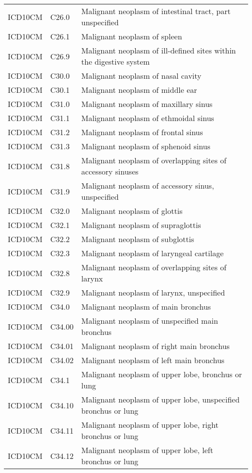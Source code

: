 \begin{table}[ht]
\begin{tabular}{lll}
  ICD10CM & C26.0 & Malignant neoplasm of intestinal tract, part unspecified \\ 
  ICD10CM & C26.1 & Malignant neoplasm of spleen \\ 
  ICD10CM & C26.9 & Malignant neoplasm of ill-defined sites within the digestive system \\ 
  ICD10CM & C30.0 & Malignant neoplasm of nasal cavity \\ 
  ICD10CM & C30.1 & Malignant neoplasm of middle ear \\ 
  ICD10CM & C31.0 & Malignant neoplasm of maxillary sinus \\ 
  ICD10CM & C31.1 & Malignant neoplasm of ethmoidal sinus \\ 
  ICD10CM & C31.2 & Malignant neoplasm of frontal sinus \\ 
  ICD10CM & C31.3 & Malignant neoplasm of sphenoid sinus \\ 
  ICD10CM & C31.8 & Malignant neoplasm of overlapping sites of accessory sinuses \\ 
  ICD10CM & C31.9 & Malignant neoplasm of accessory sinus, unspecified \\ 
  ICD10CM & C32.0 & Malignant neoplasm of glottis \\ 
  ICD10CM & C32.1 & Malignant neoplasm of supraglottis \\ 
  ICD10CM & C32.2 & Malignant neoplasm of subglottis \\ 
  ICD10CM & C32.3 & Malignant neoplasm of laryngeal cartilage \\ 
  ICD10CM & C32.8 & Malignant neoplasm of overlapping sites of larynx \\ 
  ICD10CM & C32.9 & Malignant neoplasm of larynx, unspecified \\ 
  ICD10CM & C34.0 & Malignant neoplasm of main bronchus \\ 
  ICD10CM & C34.00 & Malignant neoplasm of unspecified main bronchus \\ 
  ICD10CM & C34.01 & Malignant neoplasm of right main bronchus \\ 
  ICD10CM & C34.02 & Malignant neoplasm of left main bronchus \\ 
  ICD10CM & C34.1 & Malignant neoplasm of upper lobe, bronchus or lung \\ 
  ICD10CM & C34.10 & Malignant neoplasm of upper lobe, unspecified bronchus or lung \\ 
  ICD10CM & C34.11 & Malignant neoplasm of upper lobe, right bronchus or lung \\ 
  ICD10CM & C34.12 & Malignant neoplasm of upper lobe, left bronchus or lung \\ 

\end{tabular}
\end{table}
